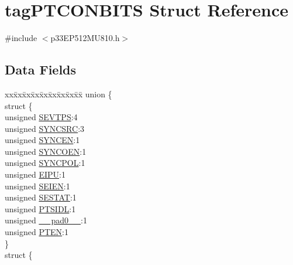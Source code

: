 \hypertarget{structtag_p_t_c_o_n_b_i_t_s}{}\section{tag\+P\+T\+C\+O\+N\+B\+I\+TS Struct Reference}
\label{structtag_p_t_c_o_n_b_i_t_s}


{\ttfamily \#include $<$p33\+E\+P512\+M\+U810.\+h$>$}

\subsection*{Data Fields}
\begin{DoxyCompactItemize}
\item 
\begin{tabbing}
xx\=xx\=xx\=xx\=xx\=xx\=xx\=xx\=xx\=\kill
union \{\\
\>struct \{\\
\>\>unsigned \hyperlink{structtag_p_t_c_o_n_b_i_t_s_ad265e80d2fbe67b2d2808ccbb6f2a567}{SEVTPS}:4\\
\>\>unsigned \hyperlink{structtag_p_t_c_o_n_b_i_t_s_a1bb9a287dbce989d2b9a9973e3b47f5b}{SYNCSRC}:3\\
\>\>unsigned \hyperlink{structtag_p_t_c_o_n_b_i_t_s_a6392f133d2270faa15aee1ce4471b7bd}{SYNCEN}:1\\
\>\>unsigned \hyperlink{structtag_p_t_c_o_n_b_i_t_s_aee433dab1c70b9e1281b911ab4cf4491}{SYNCOEN}:1\\
\>\>unsigned \hyperlink{structtag_p_t_c_o_n_b_i_t_s_ae93cf398c3356c587bda050c9c1d6553}{SYNCPOL}:1\\
\>\>unsigned \hyperlink{structtag_p_t_c_o_n_b_i_t_s_abbc746dab8c44ed4929f9cfd78dfb7fc}{EIPU}:1\\
\>\>unsigned \hyperlink{structtag_p_t_c_o_n_b_i_t_s_a6da1e1afed04bbca8b37c058fd690e64}{SEIEN}:1\\
\>\>unsigned \hyperlink{structtag_p_t_c_o_n_b_i_t_s_aec7c591bb5d18e2e8e29ec0f33d1f08a}{SESTAT}:1\\
\>\>unsigned \hyperlink{structtag_p_t_c_o_n_b_i_t_s_a3b0e6d386be2a19accd705c4ef4d2a27}{PTSIDL}:1\\
\>\>unsigned \hyperlink{structtag_p_t_c_o_n_b_i_t_s_adf71f3d8410c1f1dbbc96680a92c49af}{\_\_pad0\_\_}:1\\
\>\>unsigned \hyperlink{structtag_p_t_c_o_n_b_i_t_s_a73e3b920ca1e7e27edb00e46e2d819f3}{PTEN}:1\\
\>\} \\
\>struct \{\\

\end{tabbing}
\end{DoxyCompactItemize}
